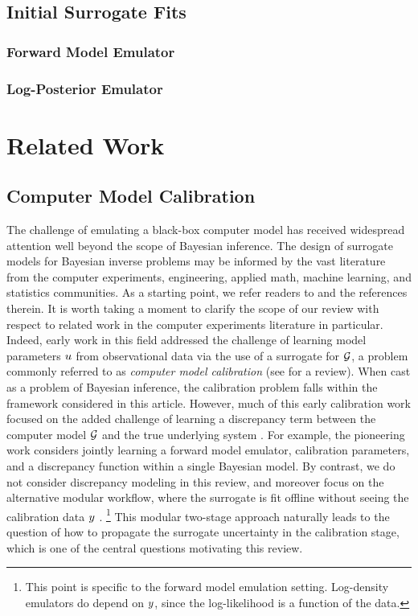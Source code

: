 \documentclass[12pt]{article}
\begin{document}
\subsection{Initial Surrogate Fits}

\subsubsection{Forward Model Emulator}
\subsubsection{Log-Posterior Emulator}


\section{Related Work} \label{sec:related-work}

\subsection{Computer Model Calibration} \label{sec:computer-model-calibration}
The challenge of emulating a black-box computer model has received widespread attention 
well beyond the scope of Bayesian inference. The design of surrogate models for Bayesian 
inverse problems may be informed by the vast literature from the computer experiments, 
engineering, applied math, machine learning, and statistics communities. As a starting point, 
we refer readers to \citet{gramacy2020surrogates,design_analysis_computer_experiments,SanterCompExp,UQpredCompSci} 
and the references therein. It is worth taking a moment to clarify the scope of our review 
with respect to related work in the computer experiments literature in particular.
Indeed, early work in this field addressed the challenge of learning 
model parameters  $u$ from observational data via the use of a surrogate for $\mathcal{G}$, a problem 
commonly referred to as \textit{computer model calibration} (see \citet{computerModelCalibrationReview}
for a review). When cast as a problem of Bayesian inference, the calibration problem falls within the 
framework considered in this article. However, much of this early calibration work focused on 
the added challenge of learning a discrepancy term between the computer model $\mathcal{G}$ and the 
true underlying system \citep{ModelDiscrepancy,emPostDens,OakleyllikEm}. 
For example, the pioneering work \citet{KOH} considers jointly learning 
a forward model emulator, calibration parameters, and a discrepancy function within a single 
Bayesian model. By contrast, we do not consider discrepancy modeling in this review, and moreover
focus on the alternative modular workflow, where the surrogate is fit offline 
without seeing the calibration data $y$ \citep{modularization}. 
\footnote{This point is specific to the forward model emulation setting. Log-density emulators 
do depend on $y$, since the log-likelihood is a function of the data.}
This modular two-stage approach naturally leads to 
the question of how to propagate the surrogate uncertainty in the calibration stage, which is one 
of the central questions motivating this review.
\end{document}
